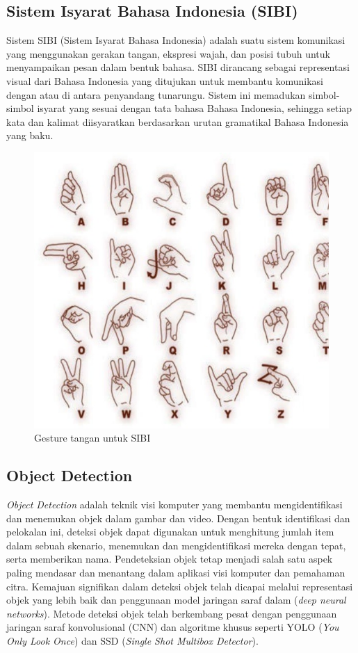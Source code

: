 \subsection{Sistem Isyarat Bahasa Indonesia (SIBI)}
Sistem SIBI (Sistem Isyarat Bahasa Indonesia) adalah suatu sistem komunikasi yang menggunakan gerakan tangan, ekspresi wajah, dan posisi tubuh untuk menyampaikan pesan dalam bentuk bahasa\cite{nugraheni2023optimalisasi}. SIBI dirancang sebagai representasi visual dari Bahasa Indonesia yang ditujukan untuk membantu komunikasi dengan atau di antara penyandang tunarungu. Sistem ini memadukan simbol-simbol isyarat yang sesuai dengan tata bahasa Bahasa Indonesia, sehingga setiap kata dan kalimat diisyaratkan berdasarkan urutan gramatikal Bahasa Indonesia yang baku.
\begin{figure} [H] 
  \centering
  \includegraphics[scale=0.7]{gambar/SIBI Gesture.png}
  \caption{Gesture tangan untuk SIBI }
  \label{fig:Sibi}
\end{figure}
\subsection{Object Detection}
\emph{Object Detection} adalah teknik visi komputer yang membantu mengidentifikasi dan menemukan objek dalam gambar dan video. Dengan bentuk identifikasi dan pelokalan ini, deteksi objek dapat digunakan untuk menghitung jumlah item dalam sebuah skenario, menemukan dan mengidentifikasi mereka dengan tepat, serta memberikan nama. Pendeteksian objek tetap menjadi salah satu aspek paling mendasar dan menantang dalam aplikasi visi komputer dan pemahaman citra. Kemajuan signifikan dalam deteksi objek telah dicapai melalui representasi objek yang lebih baik dan penggunaan model jaringan saraf dalam (\emph{deep neural networks}). Metode deteksi objek telah berkembang pesat dengan penggunaan jaringan saraf konvolusional (CNN) dan algoritme khusus seperti YOLO (\emph{You Only Look Once}) dan SSD (\emph{Single Shot Multibox Detector}).

